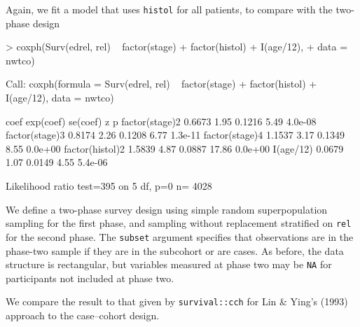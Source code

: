 \documentclass{article}
\begin{document}
Again, we fit a model that uses \texttt{histol} for all patients, to compare with the two-phase design
\begin{Schunk}
\begin{Sinput}
> coxph(Surv(edrel, rel) ~ factor(stage) + factor(histol) + I(age/12), 
+     data = nwtco)
\end{Sinput}
\begin{Soutput}
Call:
coxph(formula = Surv(edrel, rel) ~ factor(stage) + factor(histol) + 
    I(age/12), data = nwtco)


                  coef exp(coef) se(coef)     z       p
factor(stage)2  0.6673      1.95   0.1216  5.49 4.0e-08
factor(stage)3  0.8174      2.26   0.1208  6.77 1.3e-11
factor(stage)4  1.1537      3.17   0.1349  8.55 0.0e+00
factor(histol)2 1.5839      4.87   0.0887 17.86 0.0e+00
I(age/12)       0.0679      1.07   0.0149  4.55 5.4e-06

Likelihood ratio test=395  on 5 df, p=0  n= 4028 
\end{Soutput}
\end{Schunk}

We define a two-phase survey design using simple random
superpopulation sampling for the first phase, and sampling without
replacement stratified on \texttt{rel} for the second phase. The
\texttt{subset} argument specifies that observations are in the phase-two sample if they are in the subcohort or are cases.  As before, the data structure is rectangular, but variables measured at phase two may be \texttt{NA} for participants not included at phase two.

We compare the result to that given by \texttt{survival::cch} for Lin
\& Ying's (1993) approach to the case--cohort design.
\end{document}
